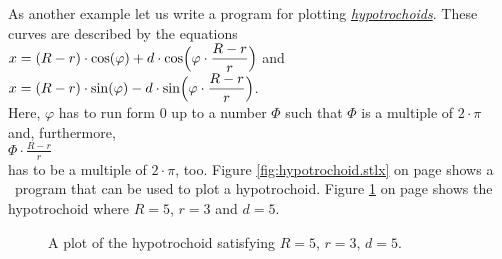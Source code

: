As another example let us write a program for plotting 
\href{https://en.wikipedia.org/wiki/Hypotrochoid}{\emph{hypotrochoids}}.  These curves are described
by the equations
\\[0.2cm]
\hspace*{1.3cm}
$\displaystyle x = (R - r) \cdot \cos(\varphi) + d \cdot \cos\Bigl(\varphi \cdot
\frac{R-r}{r}\Bigr)$ \quad and \quad
$\displaystyle x = (R - r) \cdot \sin(\varphi) - d \cdot \sin\Bigl(\varphi \cdot\frac{R-r}{r}\Bigr)$.
\\[0.2cm]
Here, $\varphi$ has to run form $0$ up to a number $\Phi$ such that $\Phi$ is a multiple of $2\cdot\pi$
and, furthermore, 
\\[0.2cm]
\hspace*{1.3cm}
$\displaystyle \Phi \cdot\frac{R-r}{r}$
\\[0.2cm]
has to be a multiple of $2 \cdot \pi$, too.  Figure \ref{fig:hypotrochoid.stlx} on page \pageref{fig:hypotrochoid.stlx}
shows a \setlx\ program that can be used to plot a hypotrochoid.  Figure \ref{fig:hypotrochoid.eps}
on page \pageref{fig:hypotrochoid.eps} shows the hypotrochoid where $R=5$, $r=3$ and $d=5$.
\begin{figure}[!ht]
  \centering
  \caption{A plot of the hypotrochoid satisfying  $R = 5$, $r=3$, $d = 5$.}
  \label{fig:hypotrochoid.eps}
\end{figure}

